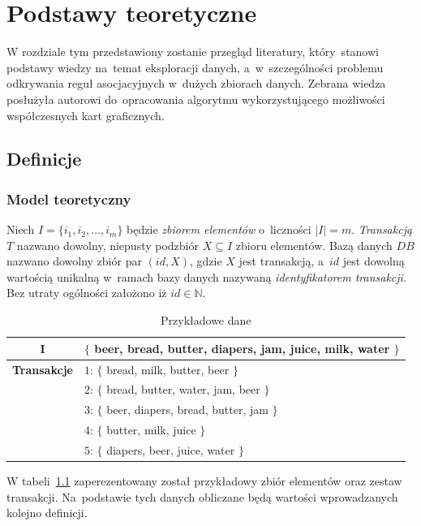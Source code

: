 \chapter{Podstawy teoretyczne\label{chap:teoria}}

W rozdziale tym przedstawiony zostanie przegląd literatury, który~stanowi podstawy wiedzy na~temat eksploracji danych, a~w~szczególności problemu odkrywania reguł asocjacyjnych w~dużych zbiorach danych. Zebrana wiedza posłużyła autorowi do~opracowania algorytmu wykorzystującego możliwości współczesnych kart graficznych.

\section{Definicje}

\subsection{Model teoretyczny}

Niech $I = \lbrace i_1,i_2,...,i_m \rbrace$ będzie \emph{zbiorem elementów} o~liczności $|I| = m$. \emph{Transakcją} $T$ nazwano dowolny, niepusty podzbiór $X \subseteq I$ zbioru elementów. Bazą danych $DB$ nazwano dowolny zbiór par $(id, X)$, gdzie $X$ jest transakcją, a~$id$ jest dowolną wartością unikalną w~ramach bazy danych nazywaną \emph{identyfikatorem transakcji}. Bez utraty ogólności założono iż $id\in \mathbb{N}$. 

\begin{table}
	\centering
	\begin{tabular}{c|l}
	$\mathbf{I}$ & $\lbrace$ beer, bread, butter, diapers, jam, juice, milk, water $\rbrace$ \\ \hline
	\textbf{Transakcje} & $1$: $\lbrace$ bread, milk, butter, beer $\rbrace$ \\
	 & $2$:  $\lbrace$ bread, butter, water, jam, beer $\rbrace$ \\ 
	 & $3$:  $\lbrace$ beer, diapers, bread, butter, jam $\rbrace$ \\ 
	 & $4$:  $\lbrace$ butter, milk, juice $\rbrace$ \\
	 & $5$:  $\lbrace$ diapers, beer, juice, water $\rbrace$ \\
	\end{tabular}
	\caption{Przykładowe dane\label{example:data}}
\end{table}

W tabeli~\ref{example:data} zaperezentowany został przykładowy zbiór elementów oraz zestaw transakcji. Na~podstawie tych danych obliczane będą wartości wprowadzanych kolejno definicji.

